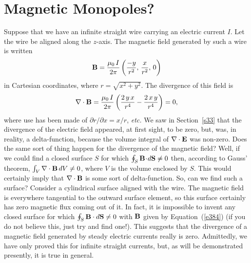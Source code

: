 \section{Magnetic Monopoles?}
Suppose that we have an infinite straight wire carrying an electric current
$I$. Let the wire be aligned along the $z$-axis. The magnetic field
generated by such a  wire is written
\begin{equation}\label{e384}
{\bf B} = \frac{\mu_0 \,I}{2\pi}\left(\frac{-y}{r^2},\, \frac{x}{r^2},\, 0 \right)
\end{equation}
in Cartesian coordinates, where $r=\sqrt{x^2+y^2}$. The divergence of this
field is
\begin{equation}
\nabla\cdot {\bf B} = \frac{\mu_0\, I}{2\pi}\left( \frac{2\,y\,x}{r^4}-\frac{2\,x\,y}{r^4}
\right) = 0,
\end{equation}
where use has been made of $\partial r/\partial x = x/r$, {\em etc.} We saw in Section~\ref{s33}
that the divergence of the electric field appeared, at first sight, to be zero, but,
was, in reality,  a delta-function, because the volume integral of
$\nabla\cdot {\bf E}$ was non-zero. Does the same
sort of thing happen for the divergence of the magnetic field? Well, if we could
find a closed surface $S$ for which $\oint_S {\bf B}\!\cdot \!d{\bf S} \neq 0$ then,
according to Gauss' theorem, $\int_V \nabla \cdot {\bf B} \,dV \neq 0 $, where 
$V$ is the volume enclosed by $S$. This would certainly imply
that $\nabla\cdot {\bf B} $ is some sort of delta-function. So, can we
find such a surface? Consider a cylindrical surface
aligned  with the wire. The magnetic field is everywhere tangential to the
outward surface element, so this surface certainly has zero magnetic flux coming
out of it. In fact, it is impossible to invent any closed surface for which
$\oint_S {\bf B}\cdot d{\bf S} \neq 0$ with ${\bf B}$ given by Equation~(\ref{e384}) (if
you do not believe this, just try and find one!). This suggests  that the divergence
of a magnetic field generated by steady electric currents
really is zero. Admittedly, we
have only proved this for infinite straight currents, but, as will be demonstrated
presently, it is true in general.

